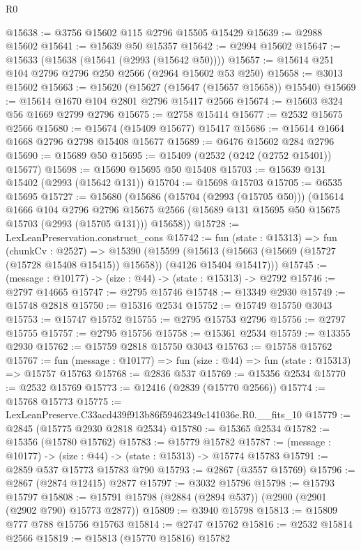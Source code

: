 \begin{lexlean}{R0}
\begin{coremodule}
@15638 := @3756 @15602 @115 @2796 @15505 @15429
@15639 := @2988 @15602
@15641 := @15639 @50 @15357
@15642 := @2994 @15602
@15647 := @15633 (@15638 (@15641 (@2993 (@15642 @50))))
@15657 := @15614 @251 @104 @2796 @2796 @250 @2566 (@2964 @15602 @53 @250)
@15658 := @3013 @15602
@15663 := @15620 (@15627 (@15647 (@15657 @15658)) @15540)
@15669 := @15614 @1670 @104 @2801 @2796 @15417 @2566
@15674 := @15603 @324 @56 @1669 @2799 @2796
@15675 := @2758 @15414
@15677 := @2532 @15675 @2566
@15680 := @15674 (@15409 @15677) @15417
@15686 := @15614 @1664 @1668 @2796 @2798 @15408 @15677
@15689 := @6476 @15602 @284 @2796
@15690 := @15689 @50
@15695 := @15409 (@2532 (@242 (@2752 @15401)) @15677)
@15698 := @15690 @15695 @50 @15408
@15703 := @15639 @131 @15402 (@2993 (@15642 @131))
@15704 := @15698 @15703
@15705 := @6535 @15695
@15727 := @15680
    (@15686
      (@15704 (@2993 (@15705 @50)))
      (@15614
        @1666
        @104
        @2796
        @2796
        @15675
        @2566
        (@15689 @131 @15695 @50 @15675 @15703 (@2993 (@15705 @131)))
        @15658))
@15728 := LexLeanPreservation.construct_cons
@15742 := fun (state : @15313) =>
  fun (chunkCv : @2527) =>
  @15390
    (@15599 (@15613 (@15663 (@15669 (@15727 (@15728 @15408 @15415)) @15658)) (@4126 @15404 @15417)))
@15745 := (message : @10177) -> (size : @44) -> (state : @15313) -> @2792
@15746 := @2797 @14665
@15747 := @2795 @15746
@15748 := @13349 @2930
@15749 := @15748 @2818
@15750 := @15316 @2534
@15752 := @15749 @15750 @3043
@15753 := @15747 @15752
@15755 := @2795 @15753 @2796
@15756 := @2797 @15755
@15757 := @2795 @15756
@15758 := @15361 @2534
@15759 := @13355 @2930
@15762 := @15759 @2818 @15750 @3043
@15763 := @15758 @15762
@15767 := fun (message : @10177) => fun (size : @44) => fun (state : @15313) => @15757 @15763
@15768 := @2836 @537
@15769 := @15356 @2534
@15770 := @2532 @15769
@15773 := @12416 (@2839 (@15770 @2566))
@15774 := @15768 @15773
@15775 := LexLeanPreserve.C33acd439f913b86f59462349c141036e.R0.__fits_10
@15779 := @2845 (@15775 @2930 @2818 @2534)
@15780 := @15365 @2534
@15782 := @15356 (@15780 @15762)
@15783 := @15779 @15782
@15787 := (message : @10177) -> (size : @44) -> (state : @15313) -> @15774 @15783
@15791 := @2859 @537 @15773 @15783 @790
@15793 := @2867 (@3557 @15769)
@15796 := @2867 (@2874 @12415) @2877
@15797 := @3032 @15796
@15798 := @15793 @15797
@15808 := @15791 @15798 (@2884 (@2894 @537)) (@2900 (@2901 (@2902 @790) @15773 @2877))
@15809 := @3940 @15798
@15813 := @15809 @777 @788 @15756 @15763
@15814 := @2747 @15762
@15816 := @2532 @15814 @2566
@15819 := @15813 (@15770 @15816) @15782

\end{coremodule}
\end{lexlean}
